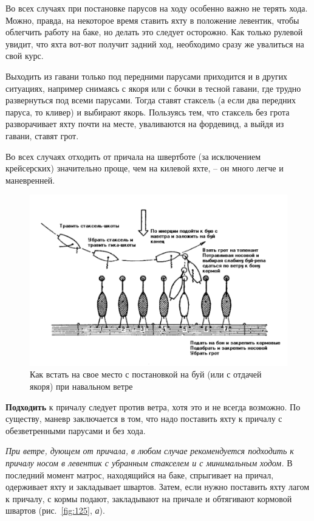 \documentclass[a4paper, 12pt, twoside, final]{scrbook}
\begin{document}
Во всех случаях при постановке парусов на ходу особенно важно не терять хода. Можно, правда, на некоторое время ставить яхту в положение левентик, чтобы облегчить работу на баке, но делать это следует осторожно. Как только рулевой увидит, что яхта вот-вот получит задний ход, необходимо сразу же увалиться на свой курс.

Выходить из гавани только под передними парусами приходится и в других ситуациях, например снимаясь с якоря или с бочки в тесной гавани, где трудно развернуться под всеми парусами. Тогда ставят стаксель (а если два передних паруса, то кливер) и выбирают якорь. Пользуясь тем, что стаксель без грота разворачивает яхту почти на месте, уваливаются на фордевинд, а выйдя из гавани, ставят грот.

Во всех случаях отходить от причала на швертботе (за исключением крейсерских) значительно проще, чем на килевой яхте, \--- он много легче и маневренней.

\begin{figure}[htbp]
   \centering
   \includegraphics{pics/126_Kak_vstat_na_mesto} %
   \caption{Как встать на свое место с постановкой на буй (или с отдачей якоря) при навальном ветре}
   \label{fig:126}
\end{figure}

\textbf{Подходить} к причалу следует против ветра, хотя это и не всегда возможно. По существу, маневр заключается в том, что надо поставить яхту к причалу с обезветренными парусами и без хода.

\textit{При ветре, дующем от причала, в любом случае рекомендуется подходить к причалу носом в левентик с убранным стакселем и с минимальным ходом.} В последний момент матрос, находящийся на баке, спрыгивает на причал, одерживает яхту и закладывает швартов. Затем, если нужно поставить яхту лагом к причалу, с кормы подают, закладывают на причале и обтягивают кормовой швартов (рис.~\ref{fig:125}, \textit{а}).
\end{document}
